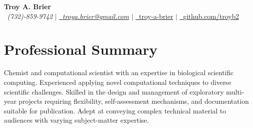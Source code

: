 \documentclass[letterpaper,10pt]{article}
\makeatletter
\newcommand{\sectionspace}{
\vspace{-17pt}
}
\newcommand{\subheadingtitlevspace}{
\vspace{-3pt}
}
\newcommand{\titleItem}[1]{
  \textbf{#1}
}
\newcommand{\resumeProjectHeading}[2]{
    \item
    \begin{tabular*}{0.97\textwidth}{l@{\extracolsep{\fill}}r}
      #1 & \textit{ #2} \\
    \end{tabular*}\vspace{-9pt}
}
\newcommand{\resumeSubHeadingListStart}{\subheadingtitlevspace\begin{itemize}[leftmargin=0.15in, label={}]}
\newcommand{\resumeSubHeadingListEnd}{\end{itemize}}
\makeatother
\begin{document}
\begin{flushleft}
    \textbf{\Large Troy A. Brier} \\    
    \Mobilefone~\textcolor{color1}{\textit{(732)-859-9742}} {\large $|$}
    \href{mailto:troya.brier@gmail.com}{{\Letter~\textcolor{color1}{\textit{troya.brier@gmail.com}}}} {\large $|$}
    \href{https://www.linkedin.com/in/troy-a-brier/}{\faLinkedin~\textcolor{color1}{troy-a-brier}} {\large $|$}
    \href{https://github.com/troyb2}{\Keyboard~\textcolor{color1}{github.com/troyb2}} %
    \vspace{-10pt}
\end{flushleft}

\section{\textcolor{color1}{Professional Summary}}
\vspace{-3pt}
\begin{itemize}[leftmargin=0.15in, label={}]
    {\item{
        {Chemist and computational scientist with an expertise in biological scientific computing.
         Experienced applying novel computational techniques to diverse scientific challenges.
         Skilled in the design and management of exploratory multi-year projects requiring flexibility, self-assessment mechanisms, and documentation suitable for publication.
         Adept at conveying complex technical material to audiences with varying subject-matter expertise.
        } \\
    }}
 \end{itemize}
 \sectionspace


          
\end{document}
